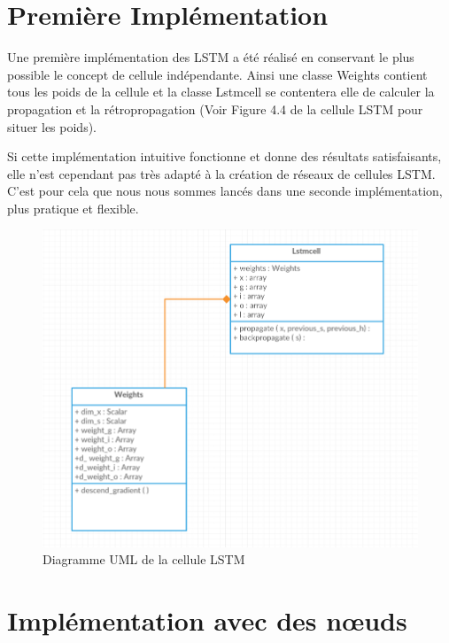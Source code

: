 \section{Première Implémentation}

Une première implémentation des LSTM a été réalisé en conservant le plus possible le concept de cellule indépendante. Ainsi une classe Weights contient tous les poids de la cellule et la classe Lstmcell se contentera elle de calculer la propagation et la rétropropagation (Voir Figure 4.4 de la cellule LSTM pour situer les poids).

Si cette implémentation intuitive fonctionne et donne des résultats satisfaisants, elle n'est cependant pas très adapté à la création de réseaux de cellules LSTM. C'est pour cela que nous nous sommes lancés dans une seconde implémentation, plus pratique et flexible.

\begin{figure}[h!]
\begin{center}
\includegraphics[scale=0.8]{images/chapter6/UML_LSTM_Implementation_1.png}
\caption{Diagramme UML de la cellule LSTM}
\label{cellule LSTM UML 1}
\end{center}
\end{figure}

\section{Implémentation avec des nœuds}

